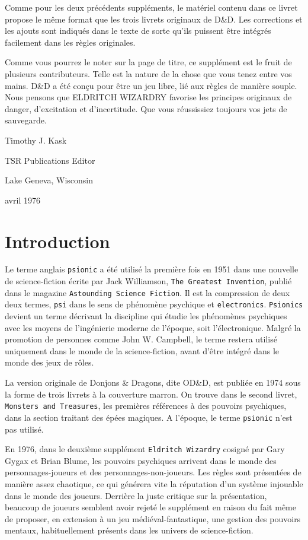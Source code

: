 \documentclass[11pt]{article}
\begin{document}
Comme pour les deux précédents suppléments, le matériel contenu dans ce livret propose le même format que les trois livrets originaux de D\&D. Les corrections et les ajouts sont indiqués dans le texte de sorte qu'ils puissent être intégrés facilement dans les règles originales.

Comme vous pourrez le noter sur la page de titre, ce supplément est le fruit de plusieurs contributeurs. Telle est la nature de la chose que vous tenez entre vos mains. D\&D a été conçu pour être un jeu libre, lié aux règles de manière souple. Nous pensons que ELDRITCH WIZARDRY favorise les principes originaux de danger, d'excitation et d'incertitude. Que vous réussissiez toujours vos jets de sauvegarde.

\vspace{1cm}

\noindent Timothy J. Kask

\noindent TSR Publications Editor

\noindent Lake Geneva, Wisconsin

 avril 1976

\newpage

\section*{Introduction}

Le terme anglais \texttt{psionic} a été utilisé la première fois en 1951 dans une nouvelle de science-fiction écrite par Jack Williamson, \texttt{The Greatest Invention}, publié dans le magazine \texttt{Astounding Science Fiction}. Il est la compression de deux deux termes, \texttt{psi} dans le sens de phénomène psychique et \texttt{electronics}. \texttt{Psionics} devient un terme décrivant la discipline qui étudie les phénomènes psychiques avec les moyens de l'ingénierie moderne de l'époque, soit l'électronique. Malgré la promotion de personnes comme John W. Campbell, le terme restera utilisé uniquement dans le monde de la science-fiction, avant d'être intégré dans le monde des jeux de rôles.

La version originale de Donjons \& Dragons, dite OD\&D, est publiée en 1974 sous la forme de trois livrets à la couverture marron. On trouve dans le second livret, \texttt{Monsters and Treasures}, les premières références à des pouvoirs psychiques, dans la section traitant des épées magiques. A l'époque, le terme \texttt{psionic} n'est pas utilisé.

En 1976, dans le deuxième supplément \texttt{Eldritch Wizardry} cosigné par Gary Gygax et Brian Blume, les pouvoirs psychiques arrivent dans le monde des personnages-joueurs et des personnages-non-joueurs. Les règles sont présentées de manière assez chaotique, ce qui générera vite la réputation d'un système injouable dans le monde des joueurs. Derrière la juste critique sur la présentation, beaucoup de joueurs semblent avoir rejeté le supplément en raison du fait même de proposer, en extension à un jeu médiéval-fantastique, une gestion des pouvoirs mentaux, habituellement présents dans les univers de science-fiction.
\end{document}
